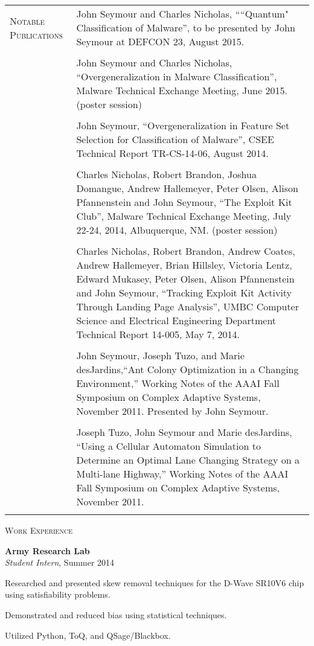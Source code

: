 \begin{tabular}{l p{340pt}}
\textsc{Notable Publications}
& John Seymour and Charles Nicholas, ````Quantum" Classification of Malware'', to be presented by John Seymour at DEFCON 23, August 2015.\\ \\
& John Seymour and Charles Nicholas, ``Overgeneralization in Malware Classification'', Malware Technical Exchange Meeting, June 2015. (poster session)\\ \\
& John Seymour, ``Overgeneralization in Feature Set Selection for Classification of Malware'', CSEE Technical Report TR-CS-14-06, August 2014.\\ \\
& Charles Nicholas, Robert Brandon, Joshua Domangue, Andrew Hallemeyer, Peter Olsen, Alison Pfannenstein and John Seymour, ``The Exploit Kit Club'', Malware Technical Exchange Meeting, July 22-24, 2014, Albuquerque, NM.  (poster session)\\ \\
& Charles Nicholas, Robert Brandon, Andrew Coates, Andrew Hallemeyer, Brian Hillsley, Victoria Lentz, Edward Mukasey, Peter Olsen, Alison Pfannenstein and John Seymour, ``Tracking Exploit Kit Activity Through Landing Page Analysis'', UMBC Computer Science and Electrical Engineering Department Technical Report 14-005, May 7, 2014.\\ \\
& John Seymour, Joseph Tuzo, and Marie desJardins,``Ant Colony Optimization in a Changing Environment,'' Working Notes of the AAAI Fall Symposium on Complex Adaptive Systems, November 2011.  Presented by John Seymour.\\ \\
& Joseph Tuzo, John Seymour and Marie desJardins,  ``Using a Cellular Automaton Simulation to Determine an Optimal Lane Changing Strategy on a Multi-lane Highway,'' Working Notes of the AAAI Fall Symposium on Complex Adaptive Systems, November 2011.\\ \\
\end{tabular}

\pagebreak
\textsc{Work Experience}

\medskip
\atab \textbf{Army Research Lab}\\
\btab \textit{Student Intern}, Summer 2014\\
\begin{my_list}
\item Researched and presented skew removal techniques for the D-Wave SR10V6 chip using satisfiability problems.
\item Demonstrated and reduced bias using statistical techniques.
\item Utilized Python, ToQ, and QSage/Blackbox.
\end{my_list}

